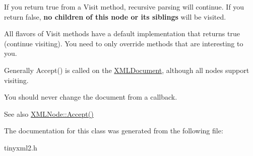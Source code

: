 If you return \textquotesingle{}true\textquotesingle{} from a Visit method, recursive parsing will continue. If you return false, {\bfseries no children of this node or its siblings} will be visited.

All flavors of Visit methods have a default implementation that returns \textquotesingle{}true\textquotesingle{} (continue visiting). You need to only override methods that are interesting to you.

Generally Accept() is called on the \mbox{\hyperlink{classtinyxml2_1_1_x_m_l_document}{X\+M\+L\+Document}}, although all nodes support visiting.

You should never change the document from a callback.

\begin{DoxySeeAlso}{See also}
\mbox{\hyperlink{classtinyxml2_1_1_x_m_l_node_a81e66df0a44c67a7af17f3b77a152785}{X\+M\+L\+Node\+::\+Accept()}} 
\end{DoxySeeAlso}


The documentation for this class was generated from the following file\+:\begin{DoxyCompactItemize}
\item 
tinyxml2.\+h\end{DoxyCompactItemize}

